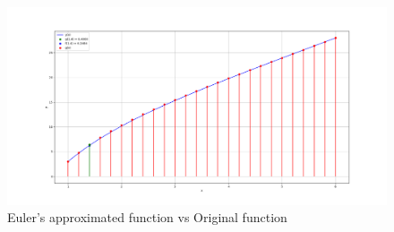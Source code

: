 \documentclass[journal,12pt,onecolumn]{IEEEtran}
\theoremstyle{remark}
\begin{document}
    \begin{figure}[!ht]    
    \centering
\graphicspath{ {2022/CE/48/figs/} }
\includegraphics[width=\columnwidth]{graph_1}
\caption{ Euler's approximated function vs Original function  }
\label{graph:ee25-gate3-graph}
\end{figure}
\end{document}

